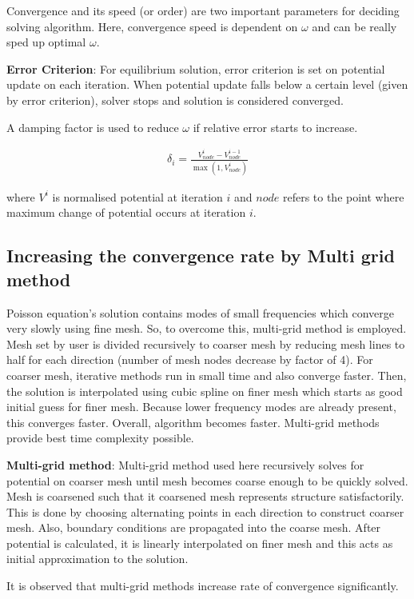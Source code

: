 Convergence and its speed (or order) are two important parameters for deciding solving algorithm. Here, convergence speed is dependent on $\omega$ and can be really sped up optimal $\omega$. 

\textbf{Error Criterion}:
For equilibrium solution, error criterion is set on potential update on each iteration. When potential update falls below a certain level (given by error criterion), solver stops and solution is considered converged.

A damping factor is used to reduce $\omega$ if relative error starts to increase. 

\begin{align*}
\delta_i = {\frac{{V^{i}_{node}-V^{i-1}_{node}}}{\max(1,V^{i}_{node})}} \tag{3.3}
\end{align*}

where $V^i$ is normalised potential at iteration $i$ and $node$ refers to the point where maximum change of potential occurs at iteration $i$.

\subsection{Increasing the convergence rate by Multi grid method}
Poisson equation's solution contains modes of small frequencies which converge very slowly using fine mesh. So, to overcome this, multi-grid method is employed. Mesh set by user is divided recursively to coarser mesh by reducing mesh lines to half for each direction (number of mesh nodes decrease by factor of 4). For coarser mesh, iterative methods run in small time and also converge faster. Then, the solution is interpolated using cubic spline on finer mesh which starts as good initial guess for finer mesh. Because lower frequency modes are already present, this converges faster. Overall, algorithm becomes faster. Multi-grid methods provide best time complexity possible.     

\textbf{Multi-grid method}: Multi-grid method used here recursively solves for potential on coarser mesh until mesh becomes coarse enough to be quickly solved. Mesh is coarsened such that it coarsened mesh represents structure satisfactorily. This is done by choosing alternating points in each direction to construct coarser mesh. Also, boundary conditions are propagated into the coarse mesh. After potential is calculated, it is linearly interpolated on finer mesh and this acts as initial approximation to the solution.

It is observed that multi-grid methods increase rate of convergence significantly.

